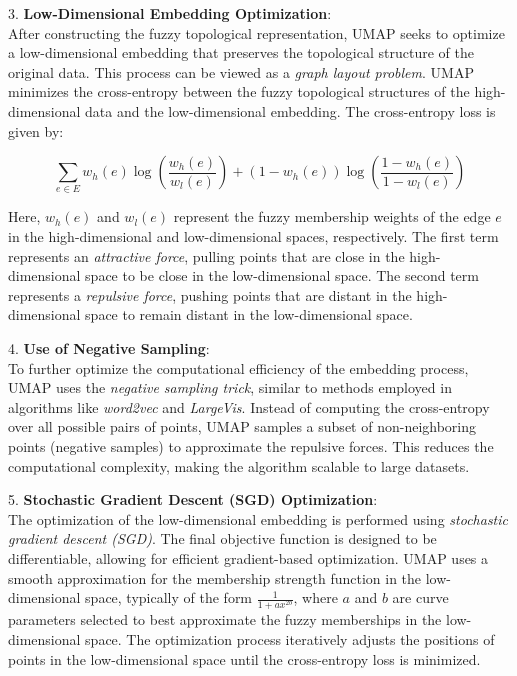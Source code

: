 3. \textbf{Low-Dimensional Embedding Optimization}:\\
After constructing the fuzzy topological representation, UMAP seeks to optimize a low-dimensional embedding that preserves the topological structure of the original data. This process can be viewed as a \textit{graph layout problem}. UMAP minimizes the cross-entropy between the fuzzy topological structures of the high-dimensional data and the low-dimensional embedding. The cross-entropy loss is given by:

\[
    \sum_{e \in E} w_h(e) \log \left( \frac{w_h(e)}{w_l(e)} \right) + (1 - w_h(e)) \log \left( \frac{1 - w_h(e)}{1 - w_l(e)} \right)
\]

Here, $w_h(e)$ and $w_l(e)$ represent the fuzzy membership weights of the edge $e$ in the high-dimensional and low-dimensional spaces, respectively. The first term represents an \textit{attractive force}, pulling points that are close in the high-dimensional space to be close in the low-dimensional space. The second term represents a \textit{repulsive force}, pushing points that are distant in the high-dimensional space to remain distant in the low-dimensional space.

4. \textbf{Use of Negative Sampling}:\\
To further optimize the computational efficiency of the embedding process, UMAP uses the \textit{negative sampling trick}, similar to methods employed in algorithms like \textit{word2vec} and \textit{LargeVis}. Instead of computing the cross-entropy over all possible pairs of points, UMAP samples a subset of non-neighboring points (negative samples) to approximate the repulsive forces. This reduces the computational complexity, making the algorithm scalable to large datasets.

5. \textbf{Stochastic Gradient Descent (SGD) Optimization}:\\
The optimization of the low-dimensional embedding is performed using \textit{stochastic gradient descent (SGD)}. The final objective function is designed to be differentiable, allowing for efficient gradient-based optimization. UMAP uses a smooth approximation for the membership strength function in the low-dimensional space, typically of the form $\frac{1}{1 + a x^{2b}}$, where $a$ and $b$ are curve parameters selected to best approximate the fuzzy memberships in the low-dimensional space. The optimization process iteratively adjusts the positions of points in the low-dimensional space until the cross-entropy loss is minimized.

